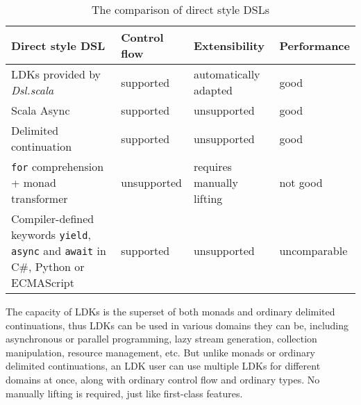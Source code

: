 \begin{table}[htbp]
  \begin{tabulary}{\linewidth}{Llll}
    Direct style DSL & Control flow & Extensibility & Performance \\
    \hline
    LDKs provided by \textit{Dsl.scala} & supported & automatically adapted & good \\
    \hline
    Scala Async & supported & unsupported & good \\
    \hline
    Delimited continuation & supported & unsupported & good \\
    \hline
    \texttt{for} comprehension + monad transformer & unsupported & requires manually lifting & not good \\
    \hline
    Compiler-defined keywords \texttt{yield}, \texttt{async} and \texttt{await} in C\#, Python or ECMAScript & supported & unsupported & uncomparable \\
  \end{tabulary}
  \caption{The comparison of direct style DSLs}
  \label{comparison}
\end{table}

The capacity of LDKs is the superset of both monads and ordinary delimited continuations, thus LDKs can be used in various domains they can be, including asynchronous or parallel programming, lazy stream generation, collection manipulation, resource management, etc. But unlike monads or ordinary delimited continuations, an LDK user can use multiple LDKs for different domains at once, along with ordinary control flow and ordinary types. No manually lifting is required, just like first-class features.

\clearpage
\appendix


\begin{acks}
\end{acks}


